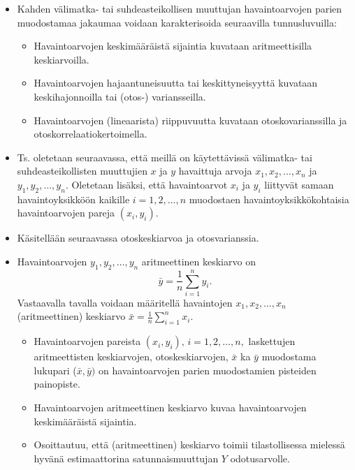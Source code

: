 \documentclass[
]{book}
\providecommand{\tightlist}{%
  \setlength{\itemsep}{0pt}\setlength{\parskip}{0pt}}
\begin{document}
\begin{itemize}
\item
  Kahden välimatka- tai suhdeasteikollisen muuttujan havaintoarvojen parien muodostamaa jakaumaa voidaan karakterisoida seuraavilla tunnusluvuilla:

  \begin{itemize}
  \tightlist
  \item
    Havaintoarvojen keskimääräistä sijaintia kuvataan aritmeettisilla keskiarvoilla.
  \item
    Havaintoarvojen hajaantuneisuutta tai keskittyneisyyttä kuvataan keskihajonnoilla tai (otos-) variansseilla.
  \item
    Havaintoarvojen (lineaarista) riippuvuutta kuvataan otoskovarianssilla ja otoskorrelaatiokertoimella.
  \end{itemize}
\item
  Ts. oletetaan seuraavassa, että meillä on käytettävissä välimatka- tai suhdeasteikollisten muuttujien \(x\) ja \(y\) havaittuja arvoja \(x_1, x_2, \ldots, x_n\) ja \(y_1, y_2, \ldots, y_n\). Oletetaan lisäksi, että havaintoarvot \(x_i\) ja \(y_i\) liittyvät samaan havaintoyksikköön kaikille \(i = 1, 2, \ldots, n\) muodostaen havaintoyksikkökohtaisia havaintoarvojen pareja \((x_i, y_i)\).
\item
  Käsitellään seuraavassa otoskeskiarvoa ja otosvarianssia.
\item
  Havaintoarvojen \(y_1, y_2,\ldots, y_n\) aritmeettinen keskiarvo on
  \[
    \bar{y} = \frac{1}{n} \sum_{i=1}^{n} y_i.
  \]
  Vastaavalla tavalla voidaan määritellä havaintojen \(x_1, x_2, \ldots, x_n\) (aritmeettinen) keskiarvo \(\bar{x}=\frac{1}{n}\sum_{i=1}^{n}x_i\).

  \begin{itemize}
  \tightlist
  \item
    Havaintoarvojen pareista \((x_i, y_i ), \, i = 1, 2,\ldots,n,\) laskettujen aritmeettisten keskiarvojen, otoskeskiarvojen, \(\bar{x}\) ka \(\bar{y}\) muodostama lukupari (\(\bar{x}, \bar{y})\) on havaintoarvojen parien muodostamien pisteiden painopiste.
  \item
    Havaintoarvojen aritmeettinen keskiarvo kuvaa havaintoarvojen keskimääräistä sijaintia.
  \item
    Osoittautuu, että (aritmeettinen) keskiarvo toimii tilastollisessa mielessä hyvänä estimaattorina satunnaismuuttujan \(Y\) odotusarvolle.
  \end{itemize}
\end{itemize}
\end{document}
